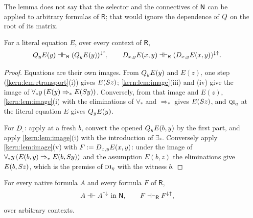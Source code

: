 The lemma does not say that the selector and the connectives of $\mathsf{N}$ can
be applied to arbitrary formulas of $\mathsf{R}$; that would ignore the
dependence of $Q_{}$ on the root of its matrix.

\begin{lemma}
\label{kern:lem:atomicnorm}
For a literal equation $E$, over every context of $\mathsf{R}$,
\[
 Q_{y}E(y)\dashv\vdash_{\mathsf{R}}(Q_{y}E(y))^{\downarrow\uparrow},
 \qquad
 D_{x,y}E(x,y)\dashv\vdash_{\mathsf{R}}(D_{x,y}E(x,y))^{\downarrow\uparrow}.
\]
\end{lemma}

\begin{proof}
Equations are their own images.  From $Q_{y}E(y)$ and $E(z)$, one step
(\cref{kern:lem:rtransport}(i)) gives $E(S z)$;
\cref{kern:lem:image}(iii) and (iv) give the image of
$\forall_* y\,(E(y)\Rightarrow_* E(S y))$.  Conversely, from that image
and $E(z)$, \cref{kern:lem:image}(i) with the eliminations of $\forall_*$
and $\Rightarrow_*$ gives $E(S z)$, and $\rulename{QI}_{\eta}$ at the
literal equation $E$ gives $Q_{y}E(y)$.

For $D_{,}$: apply  at a fresh $b$, convert the opened
$Q_{y}E(b,y)$ by the first part, and apply \cref{kern:lem:image}(i) with the
introduction of $\exists_*$.  Conversely apply \cref{kern:lem:image}(v) with
$F\mathrel{:=}D_{x,y}E(x,y)$: under the image of
$\forall_* y\,(E(b,y)\Rightarrow_* E(b,S y))$ and the assumption $E(b,z)$
the eliminations give $E(b,S z)$, which is the premise of
$\rulename{DI}_{\eta}$ with the witness $b$.
\end{proof}

\begin{theorem}
\label{kern:thm:rround}
For every native formula $A$ and every formula $F$ of $\mathsf{R}$,
\[
 A\dashv\vdash A^{\uparrow\downarrow}\ \text{in }\Nat,
 \qquad
 F\dashv\vdash_{\mathsf{R}}F^{\downarrow\uparrow},
\]
over arbitrary contexts.
\end{theorem}

